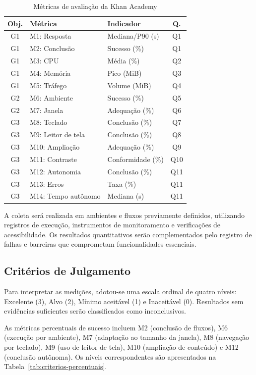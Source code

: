 \documentclass[sigconf, language=english, language=brazilian,natbib=false]{acmart}
\begin{document}
\begin{table}[htbp]
\centering
\caption{Métricas de avaliação da Khan Academy}
\label{tab:metricas}
\scriptsize
\setlength{\tabcolsep}{3pt}
\begin{tabular}{cllc}
\hline
\textbf{Obj.} & \textbf{Métrica} &
\textbf{Indicador} & \textbf{Q.} \\
\hline
G1 & M1: Resposta & Mediana/P90 (s) & Q1 \\
G1 & M2: Conclusão & Sucesso (\%) & Q1 \\
G1 & M3: CPU & Média (\%) & Q2 \\
G1 & M4: Memória & Pico (MiB) & Q3 \\
G1 & M5: Tráfego & Volume (MiB) & Q4 \\
G2 & M6: Ambiente & Sucesso (\%) & Q5 \\
G2 & M7: Janela & Adequação (\%) & Q6 \\
G3 & M8: Teclado & Conclusão (\%) & Q7 \\
G3 & M9: Leitor de tela & Conclusão (\%) & Q8 \\
G3 & M10: Ampliação & Adequação (\%) & Q9 \\
G3 & M11: Contraste & Conformidade (\%) & Q10 \\
G3 & M12: Autonomia & Conclusão (\%) & Q11 \\
G3 & M13: Erros & Taxa (\%) & Q11 \\
G3 & M14: Tempo autônomo & Mediana (s) & Q11 \\
\hline
\end{tabular}
\end{table}


A coleta será realizada em ambientes e fluxos previamente
definidos, utilizando registros de execução, instrumentos
de monitoramento e verificações de acessibilidade.
Os resultados quantitativos serão complementados pelo
registro de falhas e barreiras que comprometam
funcionalidades essenciais.

\FloatBarrier
\subsection{Critérios de Julgamento}

Para interpretar as medições, adotou-se uma escala
ordinal de quatro níveis: Excelente (3), Alvo (2),
Mínimo aceitável (1) e Inaceitável (0). Resultados
sem evidências suficientes serão classificados como
inconclusivos.

As métricas percentuais de sucesso incluem M2
(conclusão de fluxos), M6 (execução por ambiente),
M7 (adaptação ao tamanho da janela), M8 (navegação
por teclado), M9 (uso de leitor de tela), M10
(ampliação de conteúdo) e M12 (conclusão autônoma).
Os níveis correspondentes são apresentados na
Tabela~\ref{tab:criterios-percentuais}.
\end{document}
